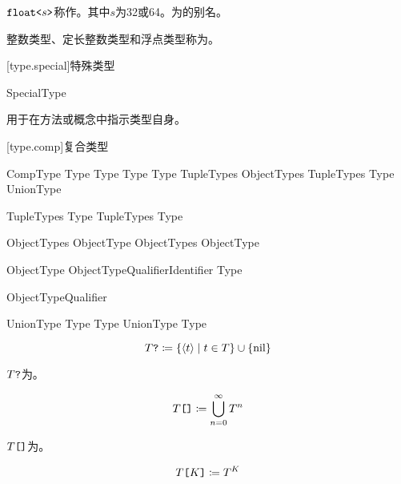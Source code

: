 \pnum
$\texttt{float<}s\texttt{>}$称作。其中$s$为32或64。为的别名。

\pnum
整数类型、定长整数类型和浮点类型称为。

[type.special]{特殊类型}

\begin{bnf}{SpecialType}
\end{bnf}

\pnum
{}用于在方法或概念中指示类型自身。

[type.comp]{复合类型}

\begin{bnf}{CompType}
    Type  \br
    Type \terminal{[} \terminal{]} \br
    Type \terminal{[} Type \terminal{]} \br
    \terminal{(} TupleTypes\bnfs \terminal{)} \br
    \terminal{\{} ObjectTypes \terminal{\}} \br
    \terminal{(} TupleTypes\bnfs \terminal{)} \terminal{->} Type \br
    UnionType
\end{bnf}

\begin{bnf}{TupleTypes}
    Type \br
    TupleTypes \terminal{,} Type
\end{bnf}

\begin{bnf}{ObjectTypes}
    ObjectType \br
    ObjectTypes \terminal{,} ObjectType
\end{bnf}

\begin{bnf}{ObjectType}
    ObjectTypeQualifier\bnfs Identifier \terminal{:} Type
\end{bnf}

\begin{bnf}{ObjectTypeQualifier}
     \br
\end{bnf}

\begin{bnf}{UnionType}
    Type \terminal{|} Type \br
    UnionType \terminal{|} Type
\end{bnf}

$$ T\texttt{?} \coloneqq \{ \langle t \rangle \mid t \in T \} \cup \{ \mathrm{nil} \} $$

\pnum
$T\texttt{?}$为。

$$ T\texttt{[]} \coloneqq \bigcup^\infty_{n=0} T^n $$

\pnum
$T\texttt{[]}$为。

$$ T\texttt{[}K\texttt{]} \coloneqq T^K $$

